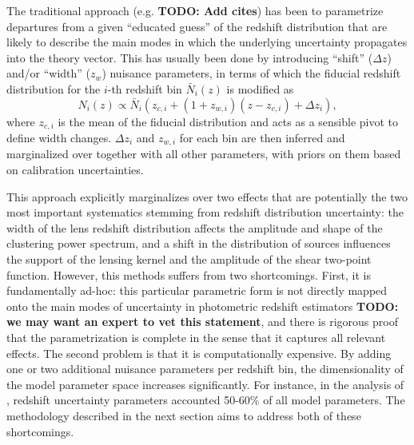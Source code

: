 \documentclass[a4paper,11pt]{article}
\newcommand{\todo}[1]{{\bf TODO: #1}}
\begin{document}
      The traditional approach (e.g. \todo{Add cites}) has been to parametrize departures from a given ``educated guess'' of the redshift distribution that are likely to describe the main modes in which the underlying uncertainty propagates into the theory vector. This has usually been done by introducing ``shift'' ($\Delta z$) and/or ``width'' ($z_w$) nuisance parameters, in terms of which the fiducial redshift distribution for the $i$-th redshift bin $\bar{N}_i(z)$ is modified as
      \begin{equation}
        N_{i}(z) \propto \bar{N}_{i}\left(z_{c,i} + (1 + z_{w, i})(z-z_{c, i}) + \Delta z_{i}\right), \label{eq:photo-z-model}
      \end{equation}
      where $z_{c,i}$ is the mean of the fiducial distribution and acts as a sensible pivot to define width changes. $\Delta z_i$ and $z_{w,i}$ for each bin are then inferred and marginalized over together with all other parameters, with priors on them based on calibration uncertainties.

      This approach explicitly marginalizes over two effects that are potentially the two most important systematics stemming from redshift distribution uncertainty: the width of the lens redshift distribution affects the amplitude and shape of the clustering power spectrum, and a shift in the distribution of sources influences the support of the lensing kernel and the amplitude of the shear two-point function. However, this methods suffers from two shortcomings. First, it is fundamentally ad-hoc: this particular parametric form is not directly mapped onto the main modes of uncertainty in photometric redshift estimators \todo{we may want an expert to vet this statement}, and there is rigorous proof that the parametrization is complete in the sense that it captures all relevant effects. The second problem is that it is computationally expensive. By adding one or two additional nuisance parameters per redshift bin, the dimensionality of the model parameter space increases significantly. For instance, in the analysis of \cite{1912.08209}, redshift uncertainty parameters accounted 50-60\% of all model parameters. The methodology described in the next section aims to address both of these shortcomings.
\end{document}
